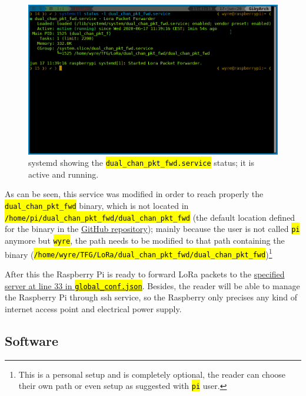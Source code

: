 \documentclass[11pt,a4paper,dvipsnames,twoside]{article}
\newcommand{\cmd}[1] {\hl{\texttt{#1}}}
\begin{document}
\begin{figure}[ht]
  \centering
  \includegraphics[width=.9\textwidth]{../pictures/pkt_fwd-service.png}
  \caption{systemd showing the \cmd{dual\_chan\_pkt\_fwd.service} status; it is active and running.}
  \label{fig:dual_chan_pkt_fwd-status}
\end{figure}

As can be seen, this service was modified in order to reach properly the \cmd{dual\_chan\_pkt\_fwd} binary, which is not located in \cmd{/home/pi/dual\_chan\_pkt\_fwd/dual\_chan\_pkt\_fwd} (the default location defined for the binary in the \href{https://github.com/dragino/dual_chan_pkt_fwd/blob/master/dual_chan_pkt_fwd.service#L9}{GitHub repository}); mainly because the user is not called \cmd{pi} anymore but \cmd{wyre}, the path needs to be modified to that path containing the binary (\cmd{/home/wyre/TFG/LoRa/dual\_chan\_pkt\_fwd/dual\_chan\_pkt\_fwd})\footnote{This is a personal setup and is completely optional, the reader can choose their own path or even setup as suggested with \cmd{pi} user.}


After this the Raspberry Pi is ready to forward LoRa packets to the \href{https://github.com/dragino/dual_chan_pkt_fwd/blob/master/global_conf.json#L33}{specified server at line 33 in \cmd{global\_conf.json}}. Besides, the reader will be able to manage the Raspberry Pi through ssh service, so the Raspberry only precises any kind of internet access point and electrical power supply.

\subsection{Software}



































\newpage
{}
{}
\printbibliography
\end{document}
